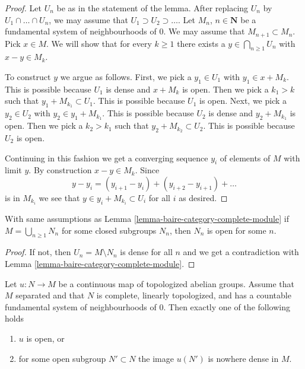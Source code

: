 \begin{proof}
Let $U_n$ be as in the statement of the lemma. After replacing $U_n$ by
$U_1 \cap \ldots \cap U_n$, we may assume that
$U_1 \supset U_2 \supset \ldots$.
Let $M_n$, $n \in \mathbf{N}$ be a fundamental
system of neighbourhoods of $0$. We may assume that
$M_{n + 1} \subset M_n$. Pick $x \in M$. We will show that
for every $k \geq 1$ there exists a $y \in \bigcap_{n \geq 1} U_n$
with $x - y \in M_k$.

\medskip\noindent
To construct $y$ we argue as follows.
First, we pick a $y_1 \in U_1$ with $y_1 \in x + M_k$.
This is possible because $U_1$ is dense and $x + M_k$ is open.
Then we pick a $k_1 > k$ such that $y_1 + M_{k_1} \subset U_1$.
This is possible because $U_1$ is open.
Next, we pick a $y_2 \in U_2$ with $y_2 \in y_1 + M_{k_1}$.
This is possible because $U_2$ is dense and $y_2 + M_{k_1}$ is open.
Then we pick a $k_2 > k_1$ such that $y_2 + M_{k_2} \subset U_2$.
This is possible because $U_2$ is open.

\medskip\noindent
Continuing in this fashion we get a converging sequence
$y_i$ of elements of $M$ with limit $y$. By construction
$x - y \in M_k$. Since
$$
y - y_i = (y_{i + 1} - y_i) + (y_{i + 2} - y_{i + 1}) + \ldots
$$
is in $M_{k_i}$ we see that $y \in y_i + M_{k_i} \subset U_i$
for all $i$ as desired.
\end{proof}

\begin{lemma}
\label{lemma-consequence-baire-complete-module}
With same assumptions as Lemma \ref{lemma-baire-category-complete-module}
if $M = \bigcup_{n \geq 1} N_n$ for some closed subgroups $N_n$,
then $N_n$ is open for some $n$.
\end{lemma}

\begin{proof}
If not, then $U_n = M \setminus N_n$ is dense for all $n$ and
we get a contradiction with Lemma \ref{lemma-baire-category-complete-module}.
\end{proof}

\begin{lemma}
\label{lemma-open-mapping}
Let $u : N \to M$ be a continuous map of topologized
abelian groups. Assume that $M$ separated and that $N$ is complete, linearly
topologized, and has a countable fundamental system of neighbourhoods of $0$.
Then exactly one of the following holds
\begin{enumerate}
\item $u$ is open, or
\item for some open subgroup $N' \subset N$ the image
$u(N')$ is nowhere dense in $M$.
\end{enumerate}
\end{lemma}

